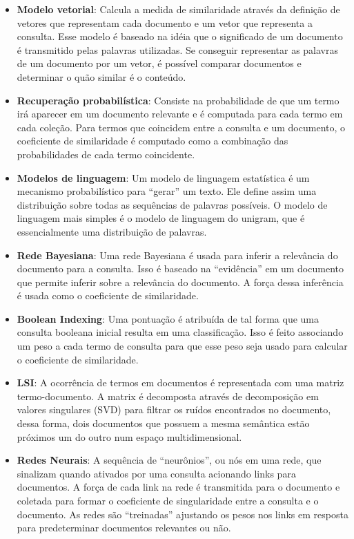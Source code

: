 \begin{itemize}
	\item{\textbf{Modelo vetorial}: Calcula a medida de similaridade através da definição de vetores que representam cada documento e um vetor que representa a consulta. Esse modelo é baseado na idéia que o significado de um documento é transmitido pelas palavras utilizadas. Se conseguir representar as palavras de um documento por um vetor, é possível comparar documentos e determinar o quão similar é o conteúdo.}
	
	\item{\textbf{Recuperação probabilística}: Consiste na probabilidade de que um termo irá aparecer em um documento relevante e é computada para cada termo em cada coleção. Para termos que coincidem entre a consulta e um documento, o coeficiente de similaridade é computado como a combinação das probabilidades de cada termo coincidente.}
	
	\item{\textbf{Modelos de linguagem}: Um modelo de linguagem estatística é um mecanismo probabilístico para “gerar” um texto. Ele define assim uma distribuição sobre todas as sequências de palavras possíveis. O modelo de linguagem mais simples é o modelo de linguagem do unigram, que é essencialmente uma distribuição de palavras.}
	
	\item{\textbf{Rede Bayesiana}: Uma rede Bayesiana é usada para inferir a relevância do documento para a consulta. Isso é baseado na “evidência” em um documento que permite inferir sobre a relevância do documento. A força dessa inferência é usada como o coeficiente de similaridade.}
	
	\item{\textbf{Boolean Indexing}: Uma pontuação é atribuída de tal forma que uma consulta booleana inicial resulta em uma classificação. Isso é feito associando um peso a cada termo de consulta para que esse peso seja usado para calcular o coeficiente de similaridade.}
	
	\item{\textbf{\ac{LSI}}: A ocorrência de termos em documentos é representada com uma matriz termo-documento. A matrix é decomposta através de decomposição em valores singulares (SVD) para filtrar os ruídos encontrados no documento, dessa forma, dois documentos que possuem a mesma semântica estão próximos um do outro num espaço multidimensional.}
	
	\item{\textbf{Redes Neurais}: A sequência de “neurônios”, ou nós em uma rede, que sinalizam quando ativados por uma consulta acionando links para documentos. A força de cada link na rede é transmitida para o documento e coletada para formar o coeficiente de singularidade entre a consulta e o documento. As redes são “treinadas” ajustando os pesos nos links em resposta para predeterminar documentos relevantes ou não.}
\end{itemize}


